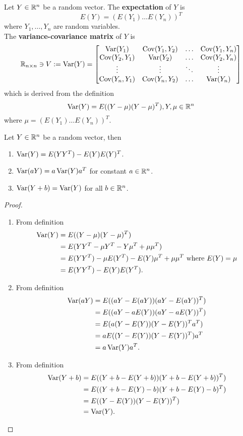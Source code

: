 \documentclass[11pt,fleqn]{book} %
\begin{document}
\begin{definition} \label{def:213}
Let \(Y \in \mathbb{R}^n\) be a random vector. The \textbf{expectation} of \(Y\) is
\[
E(Y) = (E(Y_1) \ldots E(Y_n))^T
\]
where \(Y_1, \ldots, Y_n\) are random variables. \\
\indent The \textbf{variance-covariance matrix} of \(Y\) is
\[
\mathbb{R}_{n\times n} \ni V := \operatorname{Var}(Y) = \begin{bmatrix}
\operatorname{Var}(Y_1) & \operatorname{Cov}(Y_1, Y_2) & \ldots & \operatorname{Cov}(Y_1, Y_n) \\
\operatorname{Cov}(Y_2, Y_1) & \operatorname{Var}(Y_2) & \ldots & \operatorname{Cov}(Y_2, Y_n) \\
\vdots & \vdots & \ddots & \vdots \\
\operatorname{Cov}(Y_n, Y_1) & \operatorname{Cov}(Y_n, Y_2) & \ldots & \operatorname{Var}(Y_n)
\end{bmatrix}
\]
which is derived from the definition
\[
\operatorname{Var}(Y) = E((Y - \mu)(Y - \mu)^T), Y, \mu \in \mathbb{R}^n
\]
where \(\mu = (E(Y_1) \ldots E(Y_n))^T\).
\end{definition}

\begin{proposition} \label{prop:214}
Let \(Y \in \mathbb{R}^n\) be a random vector, then
\begin{enumerate}
\item \(\operatorname{Var}(Y) = E(YY^T) - E(Y)E(Y)^T\).
\item \(\operatorname{Var}(aY) = a\operatorname{Var}(Y)a^T\) for constant \(a \in \mathbb{R}^n\).
\item \(\operatorname{Var}(Y + b) = \operatorname{Var}(Y)\) for all \(b \in \mathbb{R}^n\).
\end{enumerate}
\end{proposition}
\begin{proof} \begin{enumerate}
\item From definition
\[
\begin{aligned}
\operatorname{Var}(Y) &= E((Y - \mu)(Y - \mu)^T) \\
&= E(YY^T - \mu Y^T - Y\mu^T + \mu\mu^T) \\
&= E(YY^T) - \mu E(Y^T) - E(Y)\mu^T + \mu\mu^T \text{ where } E(Y) = \mu \\
&= E(YY^T) - E(Y)E(Y^T).
\end{aligned}
\]
\item From definition
\[
\begin{aligned}
\operatorname{Var}(aY) &= E((aY - E(aY))(aY - E(aY))^T) \\
&= E((aY - aE(Y))(aY - aE(Y))^T) \\
&= E(a(Y - E(Y))(Y - E(Y))^Ta^T) \\
&= aE((Y - E(Y))(Y - E(Y))^T)a^T \\
&= a\operatorname{Var}(Y)a^T.
\end{aligned}
\]
\item From definition
\[
\begin{aligned}
\operatorname{Var}(Y + b) &= E((Y + b - E(Y + b))(Y + b - E(Y + b))^T) \\
&= E((Y + b - E(Y) - b)(Y + b - E(Y) - b)^T) \\
&= E((Y - E(Y))(Y - E(Y))^T) \\
&= \operatorname{Var}(Y).
\end{aligned}
\]
\end{enumerate}
\end{proof}
\end{document}
